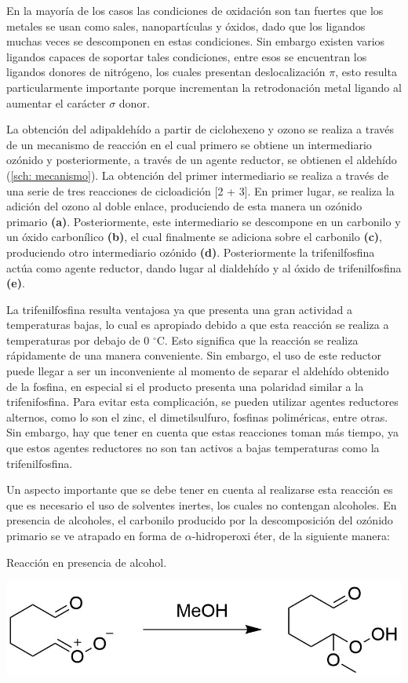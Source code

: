 \documentclass[fleqn,11pt]{SelfArx}
\begin{document}
En la mayor\'ia de los casos las condiciones de oxidaci\'on son tan fuertes que los metales se usan como sales, nanopart\'iculas y \'oxidos, dado que los ligandos muchas veces se descomponen en estas condiciones. Sin embargo existen varios ligandos capaces de soportar tales condiciones, entre esos se encuentran los ligandos donores de nitr\'ogeno, los cuales presentan deslocalizaci\'on $\pi$, esto resulta particularmente importante porque incrementan la retrodonaci\'on metal ligando al aumentar el car\'acter $\sigma$ donor\cite{Daw2014}.

La obtención del adipaldehído a partir de ciclohexeno y ozono se realiza a través de un mecanismo de reacción en el cual primero se obtiene un intermediario ozónido y posteriormente, a través de un agente reductor, se obtienen el aldehído\cite{Carey2007} (\autoref{sch: mecanismo}). La obtención del primer intermediario se realiza a través de una serie de tres reacciones de cicloadición [2 + 3]\cite{Criegee1975}. En primer lugar, se realiza la adición del ozono al doble enlace, produciendo de esta manera un ozónido primario \textbf{(a)}. Posteriormente, este intermediario se descompone en un carbonilo y un óxido carbonílico \textbf{(b)}, el cual finalmente se adiciona sobre el carbonilo \textbf{(c)}, produciendo otro intermediario ozónido \textbf{(d)}\cite{Wade2013}. Posteriormente la trifenilfosfina act\'ua como agente reductor, dando lugar al dialdeh\'ido y al \'oxido de trifenilfosfina \textbf{(e)}.

La trifenilfosfina resulta ventajosa ya que presenta una gran actividad a temperaturas bajas, lo cual es apropiado debido a que esta reacción se realiza a temperaturas por debajo de 0 $^\circ$C. Esto significa que la reacción se realiza rápidamente de una manera conveniente\cite{Knowles1960}. Sin embargo, el uso de este reductor puede llegar a ser un inconveniente al momento de separar el aldehído obtenido de la fosfina, en especial si el producto presenta una polaridad similar a la trifenifosfina\cite{doi:10.1080/00397918608057738}. Para evitar esta complicación, se pueden utilizar agentes reductores alternos, como lo son el zinc, el dimetilsulfuro, fosfinas poliméricas, entre otras\cite{Wade2013, doi:10.1080/00397918608057738}. Sin embargo, hay que tener en cuenta que estas reacciones toman más tiempo, ya que estos agentes reductores no son tan activos a bajas temperaturas como la trifenilfosfina.

Un aspecto importante que se debe tener en cuenta al realizarse esta reacción es que es necesario el uso de solventes inertes, los cuales no contengan alcoholes. En presencia de alcoholes, el carbonilo producido por la descomposición del ozónido primario se ve atrapado en forma de $\alpha$-hidroperoxi éter\cite{Keaveney1967}, de la siguiente manera:
\begin{scheme}[h]
	\centering
	\caption{Reacci\'on en presencia de alcohol.}
	\includegraphics[width=0.7\linewidth]{structures/metanol.png}
\end{scheme}
\end{document}
